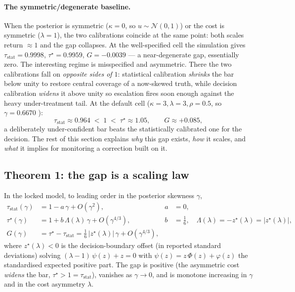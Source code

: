 \paragraph{The symmetric/degenerate baseline.}
When the posterior is symmetric ($\kappa=0$, so $u\sim\mathcal{N}(0,1)$) or the cost is symmetric
($\lambda=1$), the two calibrations coincide at the same point: both scales return $\approx 1$ and the
gap collapses. At the well-specified cell the simulation gives
$\tau_{\mathrm{stat}}=0.9998$, $\tau^\star=0.9959$, $G=-0.0039$
--- a near-degenerate gap, essentially zero. The interesting regime is misspecified and asymmetric.
There the two calibrations fall on \emph{opposite sides of $1$}: statistical calibration
\emph{shrinks} the bar below unity to restore central coverage of a now-skewed truth, while decision
calibration \emph{widens} it above unity so escalation fires soon enough against the heavy
under-treatment tail. At the default cell ($\kappa=3,\lambda=3,\rho=0.5$, so $\gamma=0.6670$
):
\begin{equation}
\tau_{\mathrm{stat}} \approx 0.964 \;<\; 1 \;<\; \tau^\star \approx 1.05,
\qquad G \approx +0.085 ,
\label{eq:oppositesides}
\end{equation}
a deliberately under-confident bar beats the statistically calibrated one for the decision. The rest
of this section explains \emph{why} this gap exists, \emph{how} it scales, and \emph{what} it implies
for monitoring a correction built on it.

\subsection{Theorem 1: the gap is a scaling law}
\label{sec:thm1}

\begin{theorem}
\label{thm:gap}
In the locked model, to leading order in the posterior skewness $\gamma$,
\begin{align}
\tau_{\mathrm{stat}}(\gamma) &= 1 - a\,\gamma + O(\gamma^2), & a&=0,\\
\tau^\star(\gamma) &= 1 + b\,\Lambda(\lambda)\,\gamma + O(\gamma^{4/3}), & b&=\tfrac16,\quad \Lambda(\lambda)=-z^\star(\lambda)=|z^\star(\lambda)|,\\
G(\gamma) &= \tau^\star-\tau_{\mathrm{stat}} = \tfrac16\,|z^\star(\lambda)|\,\gamma + O(\gamma^{4/3}),
\label{eq:gaplaw}
\end{align}
where $z^\star(\lambda)<0$ is the decision-boundary offset (in reported standard deviations) solving
$(\lambda-1)\,\psi(z)+z=0$ with $\psi(z)=z\,\Phi(z)+\varphi(z)$ the standardised expected
positive part. The gap is positive (the asymmetric cost \emph{widens} the bar,
$\tau^\star>1=\tau_{\mathrm{stat}}$), vanishes as $\gamma\to0$, and is monotone increasing in
$\gamma$ and in the cost asymmetry $\lambda$.
\end{theorem}

